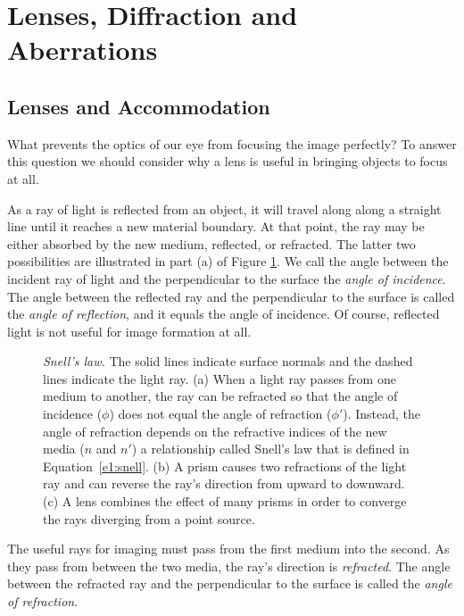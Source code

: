 \section{Lenses, Diffraction and Aberrations}

\subsection*{Lenses and Accommodation}
\label{sec1:lenses}

What prevents the optics of our eye from 
focusing the image perfectly?
To answer this question
we should consider why a lens is useful in
bringing objects to focus at all.

As a ray of light is reflected from
an object, it will travel along
along a straight line until it reaches a new material
boundary.
At that point, the ray may be either absorbed
by the new medium, reflected, or refracted.
The latter two possibilities are illustrated in 
part (a) of Figure \ref{f1:snell}.
We call the angle between the incident ray of light
and the perpendicular to the surface the {\em angle of incidence}.
The angle between the reflected ray and the perpendicular to the surface
is called the {\em angle of reflection},
and it equals the angle of incidence.
Of course, reflected light is not useful for image formation at all.
\begin{figure}
\centerline {
}
\caption[Snell's Law]{ 
{\em Snell's law.}
The solid lines indicate surface normals and the
dashed lines indicate the light ray.
(a) When a light ray passes from one medium to another,
the ray can be refracted so that
the angle of incidence
($\phi$) does not equal the angle of refraction ($\phi '$).
Instead, the angle of refraction
depends on the refractive indices of the new media
($n$ and $n'$) a relationship called
Snell's law that is defined in Equation~\ref{e1:snell}.
(b) A prism causes two refractions of the light ray
and can reverse the ray's direction from upward to downward.
(c) A lens combines the effect of many prisms in order
to converge the rays diverging from a point source.
}
\label{f1:snell}
\end{figure}
\nocite{JenkinsWhite,CornsweetBook}

The useful rays for imaging must pass from the first
medium into the second.
As they pass from between the two media,
the ray's direction is {\em refracted}.
The angle between the refracted ray
and the perpendicular to the surface
is called the {\em angle of refraction}.

